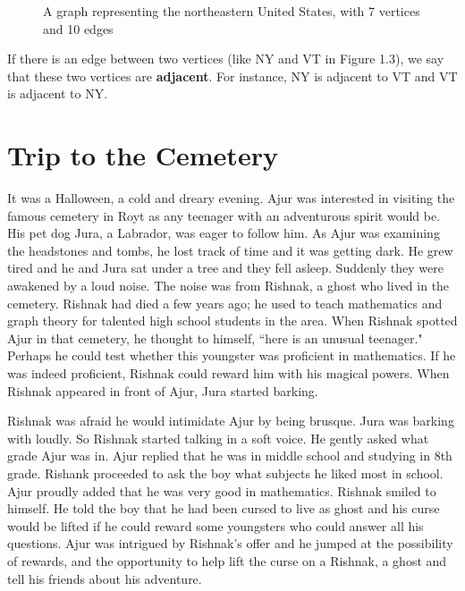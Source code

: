 \begin{figure}
\begin{center}
\caption{A graph representing the northeastern United States, with 7 vertices and 10 edges}\label{1g3}
\end{center}
\end{figure}
\begin{newpage}
\end{newpage}

If there is an edge between two vertices (like NY and VT in Figure 1.3), we say that these two vertices are \textbf{adjacent}. For instance, NY is adjacent to VT and VT is adjacent to NY.

   

\chapter{Trip to the Cemetery}
It was a Halloween, a cold and dreary evening. Ajur was interested in visiting the famous cemetery in Royt as any teenager with an adventurous spirit would be. His pet dog Jura, a Labrador, was eager to follow him. As Ajur was examining the headstones and tombs, he lost track of time and it was getting dark. He grew tired and he and Jura sat under a tree and they fell asleep. Suddenly they were awakened by a loud noise. The noise was from Rishnak, a ghost who lived in the cemetery. Rishnak had died a few years ago; he used to teach mathematics and graph theory for talented high school students in the area. When Rishnak spotted Ajur in that cemetery, he thought to himself, ``here is an unusual teenager." Perhaps he could test whether this youngster  was proficient in mathematics. If he was indeed proficient, Rishnak could reward him with his magical powers. When Rishnak appeared in front of Ajur, Jura started barking.  

Rishnak was afraid he would intimidate Ajur by being brusque. Jura was barking with loudly. So Rishnak started talking in a soft voice. He gently asked what grade Ajur was in. Ajur replied that he was in middle school and studying in 8th grade. Rishank proceeded to ask the boy what subjects he liked most in school. Ajur proudly added that he was very good in mathematics. Rishnak smiled to himself. He told the boy that he had been cursed to live as ghost and his curse would be lifted if he could reward some youngsters who could answer all his questions. Ajur was intrigued by Rishnak's offer and he jumped at the possibility of rewards, and the opportunity to help lift the curse on a Rishnak, a ghost and tell his friends about his adventure.